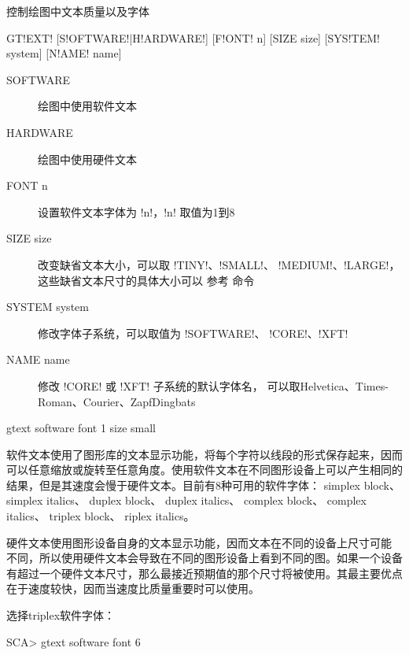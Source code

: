 \label{cmd:gtext}

控制绘图中文本质量以及字体

\begin{SACSTX}
GT!EXT! [S!OFTWARE!|H!ARDWARE!] [F!ONT! n] [SIZE size] [SYS!TEM! system] [N!AME! name]
\end{SACSTX}

\begin{description}
\item [SOFTWARE]  绘图中使用软件文本
\item [HARDWARE]  绘图中使用硬件文本
\item [FONT n] 设置软件文本字体为 !n!，!n! 取值为1到8
\item [SIZE size]  改变缺省文本大小，可以取 !TINY!、!SMALL!、
    !MEDIUM!、!LARGE!，这些缺省文本尺寸的具体大小可以
    参考  命令
\item [SYSTEM system] 修改字体子系统，可以取值为 !SOFTWARE!、
    !CORE!、!XFT!
\item [NAME name] 修改 !CORE! 或 !XFT! 子系统的默认字体名，
    可以取Helvetica、Times-Roman、Courier、ZapfDingbats
\end{description}

\begin{SACDFT}
gtext software font 1 size small
\end{SACDFT}

软件文本使用了图形库的文本显示功能，将每个字符以线段的形式保存起来，因而
可以任意缩放或旋转至任意角度。使用软件文本在不同图形设备上可以产生相同的
结果，但是其速度会慢于硬件文本。目前有8种可用的软件字体：
simplex block、
simplex italics、
duplex block、
duplex italics、
complex block、
complex italics、
triplex block、
riplex italics。

硬件文本使用图形设备自身的文本显示功能，因而文本在不同的设备上尺寸可能
不同，所以使用硬件文本会导致在不同的图形设备上看到不同的图。如果一个设备
有超过一个硬件文本尺寸，那么最接近预期值的那个尺寸将被使用。其最主要优点
在于速度较快，因而当速度比质量重要时可以使用。

选择triplex软件字体：
\begin{SACCode}
SCA> gtext software font 6
\end{SACCode}
